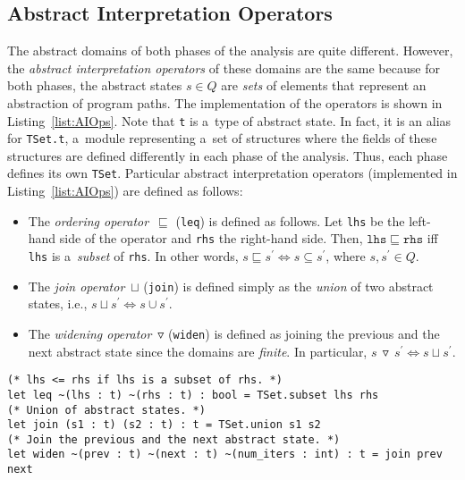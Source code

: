 \subsection{Abstract Interpretation Operators}

The abstract domains of both phases of the analysis are quite different. However, the \emph{abstract interpretation operators} of these domains are the same because for both phases, the abstract states $ s \in Q $ are \emph{sets} of elements that represent an abstraction of program paths. The implementation of the operators is shown in Listing~\ref{list:AIOps}. Note that \texttt{t} is a~type of abstract state. In fact, it is an alias for \texttt{TSet.t}, a~module representing a~set of structures where the fields of these structures are defined differently in each phase of the analysis. Thus, each phase defines its own \texttt{TSet}. Particular abstract interpretation operators (implemented in Listing~\ref{list:AIOps}) are defined as follows:
\begin{itemize}
    \item The \emph{ordering operator}~$ \sqsubseteq $ (\texttt{leq}) is defined as follows. Let \texttt{lhs} be the left-hand side of the operator and \texttt{rhs} the right-hand side. Then, $ \mathtt{lhs} \sqsubseteq \mathtt{rhs} $ iff \texttt{lhs} is a~\emph{subset} of \texttt{rhs}. In other words, $ s \sqsubseteq s^\prime \Longleftrightarrow s \subseteq s^\prime $, where $ s, s^\prime \in Q $.

    \item The \emph{join operator}~$ \sqcup $ (\texttt{join}) is defined simply as the \emph{union} of two abstract states, i.e., $ s \sqcup s^\prime \Longleftrightarrow s \cup s^\prime $.

    \item The \emph{widening operator}~$ \triangledown $ (\texttt{widen}) is defined as joining the previous and the next abstract state since the domains are \emph{finite}. In particular, $ s\,\triangledown\,s^\prime \Longleftrightarrow s \sqcup s^\prime $.
\end{itemize}

\begin{lstlisting}[style=ocaml, label={list:AIOps}, float=hbt, caption={The implementation of the \emph{abstract interpretation operators}}]
(* lhs <= rhs if lhs is a subset of rhs. *)
let leq ~(lhs : t) ~(rhs : t) : bool = TSet.subset lhs rhs
(* Union of abstract states. *)
let join (s1 : t) (s2 : t) : t = TSet.union s1 s2
(* Join the previous and the next abstract state. *)
let widen ~(prev : t) ~(next : t) ~(num_iters : int) : t = join prev next
\end{lstlisting}

